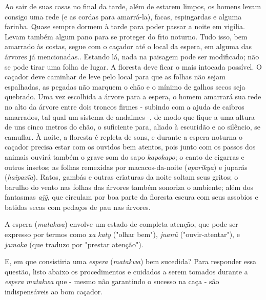 Ao sair de suas casas no final da tarde, além de estarem limpos, os
homens levam consigo uma rede (e as cordas para amarrá-la), facas,
espingardas e alguma farinha. Quase sempre dormem à tarde para poder
passar a noite em vigília. Levam também algum pano para se proteger do
frio noturno. Tudo isso, bem amarrado às costas, segue com o caçador até
o local da espera, em alguma das árvores já mencionadas.. Estando lá,
nada na paisagem pode ser modificado; não se pode tirar uma folha de
lugar. A floresta deve ficar o mais intocada possível. O caçador deve
caminhar de leve pelo local para que as folhas não sejam espalhadas, as
pegadas não marquem o chão e o mínimo de galhos secos seja quebrado. Uma
vez escolhida a árvore para a espera, o homem amarrará sua rede no alto
da árvore entre dois troncos firmes - subindo com a ajuda de caibros
amarrados, tal qual um sistema de andaimes -, de modo que fique a uma
altura de uns cinco metros do chão, o suficiente para, aliado à
escuridão e ao silêncio, se camuflar. À noite, a floresta é repleta de
sons, e durante a espera noturna o caçador precisa estar com os ouvidos
bem atentos, pois junto com os passos dos animais ouvirá também o grave
som do sapo \emph{kapokapo}; o canto de cigarras e outros insetos; as
folhas remexidas por macacos-da-noite (\emph{aparikya}) e juparás
(\emph{haipaxĩa}). Ratos, gambás e outras criaturas da noite soltam seus
gritos; o barulho do vento nas folhas das árvores também sonoriza o
ambiente; além dos fantasmas \emph{ajỹ}, que circulam por boa parte da
floresta escura com seus assobios e batidas secas com pedaços de pau nas
árvores.

A espera (\emph{matakwa}) envolve um estado de completa atenção, que
pode ser expresso por termos como \emph{xa} \emph{katy} ("olhar bem"),
\emph{juanũ} ("ouvir-atentar"), e \emph{jamaka} (que traduzo por
"prestar atenção").

E, em que consistiria uma \emph{espera} (\emph{matakwa}) bem sucedida?
Para responder essa questão, listo abaixo os procedimentos e cuidados a
serem tomados durante a \emph{espera} \emph{matakwa} que - mesmo não
garantindo o sucesso na caça - são indispensáveis ao bom caçador.

